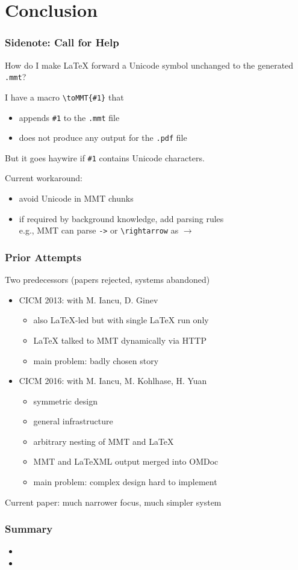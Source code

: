 \section{Conclusion}


\begin{frame}[fragile]\frametitle{Sidenote: Call for Help}
How do I make LaTeX forward a Unicode symbol unchanged to the generated \texttt{.mmt}?
\bigskip

I have a macro \verb|\toMMT{#1}| that
\begin{itemize}
 \item appends \verb|#1| to the \texttt{.mmt} file
 \item does not produce any output for the \texttt{.pdf} file
\end{itemize}

But it goes haywire if \verb|#1| contains Unicode characters.
\bigskip

Current workaround:
\begin{itemize}
\item avoid Unicode in MMT chunks
\item if required by background knowledge, add parsing rules\\
 e.g., MMT can parse \verb|->| or \verb|\rightarrow| as $\rightarrow$
\end{itemize}
\end{frame}

\begin{frame}\frametitle{Prior Attempts}
Two predecessors (papers rejected, systems abandoned)
\begin{itemize}
 \item CICM 2013: with M. Iancu, D. Ginev
  \begin{itemize}
  \item also LaTeX-led but with single LaTeX run only
  \item LaTeX talked to MMT dynamically via HTTP
  \item main problem: badly chosen story
  \end{itemize}
 \item CICM 2016: with M. Iancu, M. Kohlhase, H. Yuan
  \begin{itemize}
  \item symmetric design
  \item general infrastructure
  \item arbitrary nesting of MMT and LaTeX
  \item MMT and LaTeXML output merged into OMDoc
  \item main problem: complex design hard to implement
  \end{itemize}
\end{itemize}
Current paper: much narrower focus, much simpler system
\end{frame}

\begin{frame}\frametitle{Summary}
\begin{itemize}
 \item 
 \item 
\end{itemize}
\end{frame}